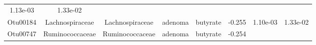 \documentclass[11pt,]{article}
\begin{document}
\begin{longtable}[]{@{}cccccccc@{}}
\begin{minipage}[t]{0.08\columnwidth}
1.13e-03\strut
\end{minipage} & \begin{minipage}[t]{0.08\columnwidth}\centering\strut
1.33e-02\strut
\end{minipage}\tabularnewline
\begin{minipage}[t]{0.08\columnwidth}\centering\strut
Otu00184\strut
\end{minipage} & \begin{minipage}[t]{0.15\columnwidth}\centering\strut
Lachnospiraceae\strut
\end{minipage} & \begin{minipage}[t]{0.15\columnwidth}\centering\strut
Lachnospiraceae\strut
\end{minipage} & \begin{minipage}[t]{0.08\columnwidth}\centering\strut
adenoma\strut
\end{minipage} & \begin{minipage}[t]{0.09\columnwidth}\centering\strut
butyrate\strut
\end{minipage} & \begin{minipage}[t]{0.07\columnwidth}\centering\strut
-0.255\strut
\end{minipage} & \begin{minipage}[t]{0.08\columnwidth}\centering\strut
1.10e-03\strut
\end{minipage} & \begin{minipage}[t]{0.08\columnwidth}\centering\strut
1.33e-02\strut
\end{minipage}\tabularnewline
\begin{minipage}[t]{0.08\columnwidth}\centering\strut
Otu00747\strut
\end{minipage} & \begin{minipage}[t]{0.15\columnwidth}\centering\strut
Ruminococcaceae\strut
\end{minipage} & \begin{minipage}[t]{0.15\columnwidth}\centering\strut
Ruminococcaceae\strut
\end{minipage} & \begin{minipage}[t]{0.08\columnwidth}\centering\strut
adenoma\strut
\end{minipage} & \begin{minipage}[t]{0.09\columnwidth}\centering\strut
butyrate\strut
\end{minipage} & \begin{minipage}[t]{0.07\columnwidth}\centering\strut
-0.254\strut
\end{minipage} & \begin{minipage}[t]{0.08\columnwidth}\centering\strut

\end{minipage}
\end{longtable}
\end{document}
